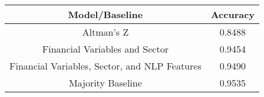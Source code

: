 \footnotesize
\begin{tabular}{cc}
\toprule
Model/Baseline & Accuracy \\
\midrule
Altman's Z & 0.8488 \\
Financial Variables and Sector & 0.9454 \\
Financial Variables, Sector, and NLP Features & 0.9490 \\
Majority Baseline & 0.9535 \\
\bottomrule
\end{tabular}

\normalsize